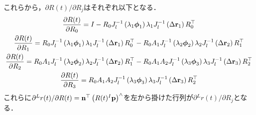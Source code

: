 これらから，$\partial R(t) / \partial R_{j}$はそれぞれ以下となる．
%
\begin{align}
  \begin{gathered}
    \frac{ \partial R(t) }{ \partial R_{0} }
    =
    I - R_{0} J_{l}^{-1} \left( \lambda_{1} \boldsymbol \phi_{1} \right) \lambda_{1} J_{l}^{-1} \left( \Delta {\bf r}_{1} \right) R_{0}^{\top} \\
    \frac{ \partial R(t) }{ \partial R_{1} }
    =
    R_{0} J_{l}^{-1} \left( \lambda_{1} \boldsymbol \phi_{1} \right) \lambda_{1} J_{l}^{-1} \left( \Delta {\bf r}_{1} \right) R_{0}^{\top}
    -R_{0} A_{1} J_{l}^{-1} \left( \lambda_{2} \boldsymbol \phi_{2} \right) \lambda_{2} J_{l}^{-1} \left( \Delta {\bf r}_{2} \right) R_{1}^{\top} \\
    \frac{ \partial R(t) }{ \partial R_{2} }
    =
    R_{0} A_{1} J_{l}^{-1} \left( \lambda_{2} \boldsymbol \phi_{2} \right) \lambda_{2} J_{l}^{-1} \left( \Delta {\bf r}_{2} \right) R_{1}^{\top}
    -R_{0} A_{1} A_{2} J_{l}^{-1} \left( \lambda_{3} \boldsymbol \phi_{3} \right) \lambda_{3} J_{l}^{-1} \left( \Delta {\bf r}_{3} \right) R_{2}^{\top} \\
    \frac{ \partial R(t) }{ \partial R_{3} }
    =
    R_{0} A_{1} A_{2} J_{l}^{-1} \left( \lambda_{3} \boldsymbol \phi_{3} \right) \lambda_{3} J_{l}^{-1} \left( \Delta {\bf r}_{3} \right) R_{2}^{\top}
  \end{gathered}
\end{align}
%
これらに$\partial {}^{L}r(t) / \partial R(t) = {\bf n}^{\top} \left( R(t) {}^{I}{\bf p} \right)^{\wedge}$を左から掛けた行列が$\partial {}^{L}r(t) / \partial R_{j}$となる．

